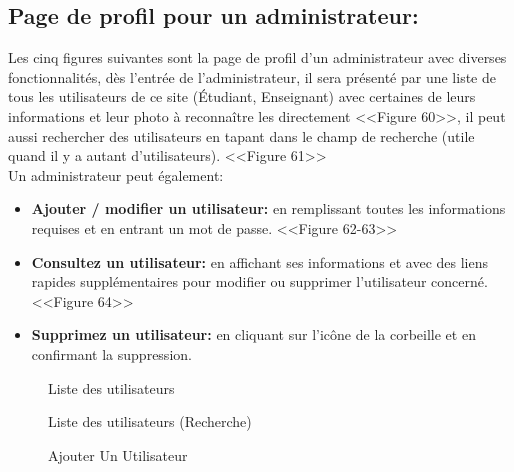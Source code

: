 \documentclass[12pt]{report}
\begin{document}
\newpage

\vspace*{-0.6in}
\subsection{Page de profil pour un administrateur:}

Les cinq figures suivantes sont la page de profil d'un administrateur avec diverses fonctionnalités, dès l'entrée de l'administrateur, il sera présenté par une liste de tous les utilisateurs de ce site (Étudiant, Enseignant) avec certaines de leurs informations et leur photo à reconnaître les directement <<Figure 60>>, il peut aussi rechercher des utilisateurs en tapant dans le champ de recherche (utile quand il y a autant d'utilisateurs). <<Figure 61>>
\\
Un administrateur peut également:

\begin{itemize}
  \item \textbf{Ajouter / modifier un utilisateur:} en remplissant toutes les informations requises et en entrant un mot de passe. <<Figure 62-63>>
  \item \textbf{Consultez un utilisateur:} en affichant ses informations et avec des liens rapides supplémentaires pour modifier ou supprimer l'utilisateur concerné. <<Figure 64>>
  \item \textbf{Supprimez un utilisateur:} en cliquant sur l'icône de la corbeille et en confirmant la suppression.
\end{itemize}

\begin{figure}[h]
\centering
  \hspace*{-0.33in}
\caption{Liste des utilisateurs}
\end{figure}

\newpage

\begin{figure}[H]
\centering
  \vspace*{-0.3in}
  \hspace*{-0.1in}
\caption{Liste des utilisateurs (Recherche)}
\end{figure}

\begin{figure}[H]
\centering
  \vspace*{0.05in}
  \hspace*{-0.1in}
\caption{Ajouter Un Utilisateur}
  \vspace*{-0.1in}
\end{figure}
\end{document}
